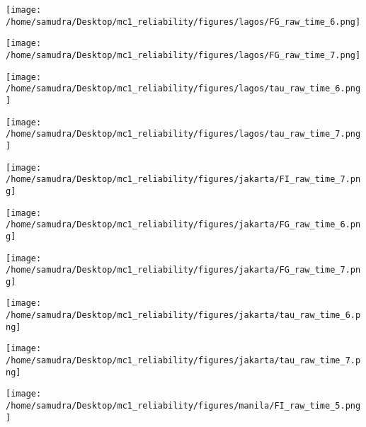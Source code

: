 \documentclass[a4paper]{article}
\def\lthtmlcheckvsize{\ifdim\ht\sizebox<\vsize 
  \ifdim\wd\sizebox<\hsize\expandafter\hfill\fi \expandafter\vfill
  \else\expandafter\vss\fi}%
\begin{document}
{\newpage\clearpage
{}%
\texttt{[image: /home/samudra/Desktop/mc1\_reliability/figures/lagos/FG\_raw\_time\_6.png]}%
\lthtmlpictureZ
\lthtmlcheckvsize\clearpage}

{\newpage\clearpage
{}%
\texttt{[image: /home/samudra/Desktop/mc1\_reliability/figures/lagos/FG\_raw\_time\_7.png]}%
\lthtmlpictureZ
\lthtmlcheckvsize\clearpage}

{\newpage\clearpage
{}%
\texttt{[image: /home/samudra/Desktop/mc1\_reliability/figures/lagos/tau\_raw\_time\_6.png]}%
\lthtmlpictureZ
\lthtmlcheckvsize\clearpage}

{\newpage\clearpage
{}%
\texttt{[image: /home/samudra/Desktop/mc1\_reliability/figures/lagos/tau\_raw\_time\_7.png]}%
\lthtmlpictureZ
\lthtmlcheckvsize\clearpage}

{\newpage\clearpage
{}%
\texttt{[image: /home/samudra/Desktop/mc1\_reliability/figures/jakarta/FI\_raw\_time\_7.png]}%
\lthtmlpictureZ
\lthtmlcheckvsize\clearpage}

{\newpage\clearpage
{}%
\texttt{[image: /home/samudra/Desktop/mc1\_reliability/figures/jakarta/FG\_raw\_time\_6.png]}%
\lthtmlpictureZ
\lthtmlcheckvsize\clearpage}

{\newpage\clearpage
{}%
\texttt{[image: /home/samudra/Desktop/mc1\_reliability/figures/jakarta/FG\_raw\_time\_7.png]}%
\lthtmlpictureZ
\lthtmlcheckvsize\clearpage}

{\newpage\clearpage
{}%
\texttt{[image: /home/samudra/Desktop/mc1\_reliability/figures/jakarta/tau\_raw\_time\_6.png]}%
\lthtmlpictureZ
\lthtmlcheckvsize\clearpage}

{\newpage\clearpage
{}%
\texttt{[image: /home/samudra/Desktop/mc1\_reliability/figures/jakarta/tau\_raw\_time\_7.png]}%
\lthtmlpictureZ
\lthtmlcheckvsize\clearpage}

{\newpage\clearpage
{}%
\texttt{[image: /home/samudra/Desktop/mc1\_reliability/figures/manila/FI\_raw\_time\_5.png]}%
\lthtmlpictureZ
\lthtmlcheckvsize\clearpage}
\end{document}
